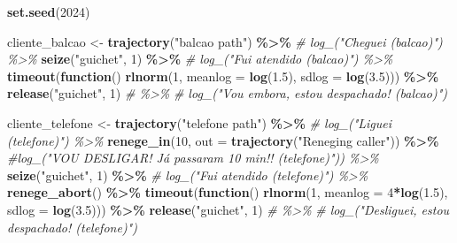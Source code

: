 \documentclass[
]{article}
\newenvironment{Shaded}{\begin{snugshade}}{\end{snugshade}}
\newcommand{\AttributeTok}[1]{\textcolor[rgb]{0.13,0.29,0.53}{#1}}
\newcommand{\CommentTok}[1]{\textcolor[rgb]{0.56,0.35,0.01}{\textit{#1}}}
\newcommand{\ControlFlowTok}[1]{\textcolor[rgb]{0.13,0.29,0.53}{\textbf{#1}}}
\newcommand{\DecValTok}[1]{\textcolor[rgb]{0.00,0.00,0.81}{#1}}
\newcommand{\FloatTok}[1]{\textcolor[rgb]{0.00,0.00,0.81}{#1}}
\newcommand{\FunctionTok}[1]{\textcolor[rgb]{0.13,0.29,0.53}{\textbf{#1}}}
\newcommand{\NormalTok}[1]{#1}
\newcommand{\OtherTok}[1]{\textcolor[rgb]{0.56,0.35,0.01}{#1}}
\newcommand{\SpecialCharTok}[1]{\textcolor[rgb]{0.81,0.36,0.00}{\textbf{#1}}}
\newcommand{\StringTok}[1]{\textcolor[rgb]{0.31,0.60,0.02}{#1}}
\begin{document}
\begin{Shaded}
\begin{Highlighting}[]
\FunctionTok{set.seed}\NormalTok{(}\DecValTok{2024}\NormalTok{)}

\NormalTok{cliente\_balcao }\OtherTok{\textless{}{-}} \FunctionTok{trajectory}\NormalTok{(}\StringTok{"balcao path"}\NormalTok{) }\SpecialCharTok{\%\textgreater{}\%}
  \CommentTok{\# log\_("Cheguei (balcao)") \%\textgreater{}\%}
  \FunctionTok{seize}\NormalTok{(}\StringTok{"guichet"}\NormalTok{, }\DecValTok{1}\NormalTok{) }\SpecialCharTok{\%\textgreater{}\%}
  \CommentTok{\# log\_("Fui atendido (balcao)") \%\textgreater{}\%}
  \FunctionTok{timeout}\NormalTok{(}\ControlFlowTok{function}\NormalTok{()  }\FunctionTok{rlnorm}\NormalTok{(}\DecValTok{1}\NormalTok{, }\AttributeTok{meanlog =} \FunctionTok{log}\NormalTok{(}\FloatTok{1.5}\NormalTok{), }\AttributeTok{sdlog =} \FunctionTok{log}\NormalTok{(}\FloatTok{3.5}\NormalTok{))) }\SpecialCharTok{\%\textgreater{}\%}
  \FunctionTok{release}\NormalTok{(}\StringTok{"guichet"}\NormalTok{, }\DecValTok{1}\NormalTok{) }\CommentTok{\# \%\textgreater{}\%}
  \CommentTok{\# log\_("Vou embora, estou despachado! (balcao)")}

\NormalTok{cliente\_telefone }\OtherTok{\textless{}{-}} \FunctionTok{trajectory}\NormalTok{(}\StringTok{"telefone path"}\NormalTok{) }\SpecialCharTok{\%\textgreater{}\%}
  \CommentTok{\# log\_("Liguei (telefone)") \%\textgreater{}\%}
  \FunctionTok{renege\_in}\NormalTok{(}\DecValTok{10}\NormalTok{, }\AttributeTok{out =} \FunctionTok{trajectory}\NormalTok{(}\StringTok{"Reneging caller"}\NormalTok{)) }\SpecialCharTok{\%\textgreater{}\%}
        \CommentTok{\#log\_("VOU DESLIGAR! Já passaram 10 min!! (telefone)")) \%\textgreater{}\%}
  \FunctionTok{seize}\NormalTok{(}\StringTok{"guichet"}\NormalTok{, }\DecValTok{1}\NormalTok{) }\SpecialCharTok{\%\textgreater{}\%}
  \CommentTok{\# log\_("Fui atendido (telefone)") \%\textgreater{}\%}
  \FunctionTok{renege\_abort}\NormalTok{() }\SpecialCharTok{\%\textgreater{}\%}
  \FunctionTok{timeout}\NormalTok{(}\ControlFlowTok{function}\NormalTok{() }\FunctionTok{rlnorm}\NormalTok{(}\DecValTok{1}\NormalTok{, }\AttributeTok{meanlog =} \DecValTok{4}\SpecialCharTok{*}\FunctionTok{log}\NormalTok{(}\FloatTok{1.5}\NormalTok{), }\AttributeTok{sdlog =} \FunctionTok{log}\NormalTok{(}\FloatTok{3.5}\NormalTok{))) }\SpecialCharTok{\%\textgreater{}\%}
  \FunctionTok{release}\NormalTok{(}\StringTok{"guichet"}\NormalTok{, }\DecValTok{1}\NormalTok{) }\CommentTok{\# \%\textgreater{}\%}
  \CommentTok{\# log\_("Desliguei, estou despachado! (telefone)")}



\end{Highlighting}
\end{Shaded}
\end{document}
